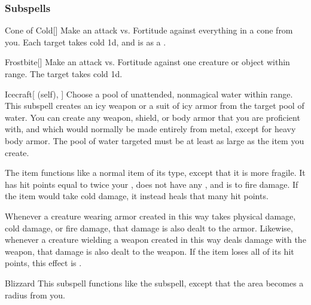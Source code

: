 \subsubsection{Subspells}


\begin{ability}[\nth{1}]{Cone of Cold}[]
Make an attack vs. Fortitude against everything in a \areamed cone from you.
\hit Each target takes cold  \minus1d, and is  as a .
\end{ability}
\vspace{0.25em}


\begin{ability}[\nth{1}]{Frostbite}[]
Make an attack vs. Fortitude against one creature or object within \rngmed range.
\hit The target takes cold  \plus1d.
\end{ability}
\vspace{0.25em}


\begin{ability}[\nth{1}]{Icecraft}[ (self), ]
Choose a pool of unattended, nonmagical water within \rngclose range.
This subspell creates an icy weapon or a suit of icy armor from the target pool of water.
You can create any weapon, shield, or body armor that you are proficient with, and which would normally be made entirely from metal, except for heavy body armor.
The pool of water targeted must be at least as large as the item you create.

The item functions like a normal item of its type, except that it is more fragile.
It has hit points equal to twice your , does not have any , and is  to fire damage.
If the item would take cold damage, it instead heals that many hit points.

Whenever a creature wearing armor created in this way takes physical damage, cold damage, or fire damage, that damage is also dealt to the armor.
Likewise, whenever a creature wielding a weapon created in this way deals damage with the weapon, that damage is also dealt to the weapon.
If the item loses all of its hit points, this effect is .
\end{ability}
\vspace{0.25em}


\begin{ability}[\nth{2}]{Blizzard}
This subspell functions like the  subspell, except that the area becomes a \areamed radius from you.
\end{ability}
\vspace{0.25em}



